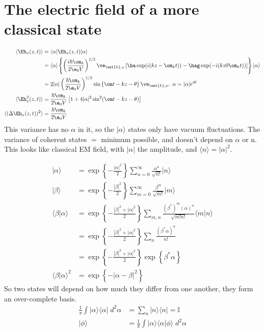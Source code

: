 \documentclass[a4paper, 11pt, normalem]{report}
\begin{document}
\section{The electric field of a more classical state}
\begin{align}
    \langle\Eh_x(z,t)\rangle &= \langle\alpha|\Eh_x(z,t)|\alpha\rangle \\
                             &= \langle\alpha|\left\{\left(\frac{i\hbar\om_k}{2\e_0V}\right)^{1/2}\ve_{\unl{k},x}\left[\ha\exp(i(kz-\om_kt)) - \hag\exp(-i(kz0\om_kt))\right]\right\}|\alpha\rangle \\
                             &= 2|\alpha|\left(\frac{\hbar\om_k}{2\e_0V}\right)^{1/2}\sin\left\{\om t - kz - \theta\right\}\ve_{\unl{k},x},\; \alpha = |\alpha|e^{i\theta} \\
    \langle\Eh_x^2(z,t)\rangle &= \frac{\hbar\om_k}{2\e_0V}\left[1+4|\alpha|^2\sin^2(\om t-kz-\theta)\right] \\
    \langle(\Delta \Eh_x(z,t))^2\rangle &= \frac{\hbar\om_k}{2\e_0V}
\end{align}
This variance has no $\alpha$ in it, so the $|\alpha\rangle$ states only have vacuum fluctuations.
The variance of coherent states $=$ minimum possible, and doesn't depend on $\alpha$ or n.
This looks like classical EM field, with $|\alpha|$ the amplitude, and $\langle n\rangle = |\alpha|^2$.
\begin{figure}[H]
    \centering
\end{figure}
\begin{align}
    |\alpha\rangle &= \exp\left\{-\frac{|\alpha|^2}{2}\right\}\sum_{n=0}^\infty \frac{\alpha^n}{\sqrt{n!}}|n\rangle \\
    |\beta\rangle &= \exp\left\{-\frac{|\beta|^2}{2}\right\}\sum_{m=0}^\infty \frac{\beta^m}{\sqrt{m!}}|m\rangle \\
    \langle\beta|\alpha\rangle &= \exp\left\{-\frac{|\beta|^2+|\alpha|^2}{2}\right\}\sum_{m,n} \frac{(\beta^*)^m(\alpha)^n}{\sqrt{m!n!}}\langle m|n\rangle \\
                               &= \exp\left\{-\frac{|\beta|^2+|\alpha|^2}{2}\right\}\sum_n \frac{(\beta^*\alpha)^n}{n!} \\
                               &= \exp\left\{-\frac{|\beta|^2+|\alpha|^2}{2}\right\}\exp\left\{\beta^*\alpha\right\} \\
    \langle\beta|\alpha\rangle^2 &= \exp\left\{-|\alpha-\beta|^2\right\}
\end{align}
So two states will depend on how much they differ from one another, they form an over-complete basis. 
\begin{align}
    \frac{1}{\pi}\int |\alpha\rangle\langle\alpha|\;d^2\alpha &= \sum_n |n\rangle\langle n| = \mathbb{I} \\
    |\phi\rangle &= \frac{1}{\pi}\int |\alpha\rangle\langle\alpha|\phi\rangle\;d^2\alpha
\end{align}
\end{document}
